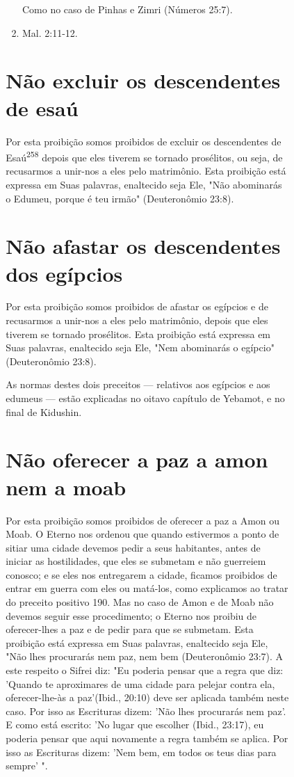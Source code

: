 \begin{itemize}
\begin{enumrate}
\begin{itemize}
\begin{itemize}
\begin{itemize}
\begin{enumerate}
 Como no caso de Pinhas e Zimri (Números 25:7).
 
\item
 
 Mal. 2:11-12.
 
\end{enumerate}



\section{Não excluir os descendentes de esaú}

Por esta proibição somos proibidos de excluir os descendentes de
Esaú\textsuperscript{258} depois que eles tiverem se tornado prosélitos,
ou seja, de recusarmos a unir-nos a eles pelo matrimônio. Esta proibição
está expressa em Suas pala­vras, enaltecido seja Ele, "Não abominarás o
Edumeu, porque é teu irmão" (Deu­teronômio 23:8).


\section{Não afastar os descendentes dos egípcios}


Por esta proibição somos proibidos de afastar os egípcios e de
recu­sarmos a unir-nos a eles pelo matrimônio, depois que eles tiverem
se tornado prosélitos. Esta proibição está expressa em Suas palavras,
enaltecido seja Ele, "Nem abominarás o egípcio" (Deuteronômio 23:8).

As normas destes dois preceitos --- relativos aos egípcios e aos
edu­meus --- estão explicadas no oitavo capítulo de Yebamot, e no final
de Kidushin.

\section{Não oferecer a paz a amon nem a moab}

Por esta proibição somos proibidos de oferecer a paz a Amon ou Moab. O
Eterno nos ordenou que quando estivermos a ponto de sitiar uma ci­dade
devemos pedir a seus habitantes, antes de iniciar as hostilidades, que
eles se submetam e não guerreiem conosco; e se eles nos entregarem a
cidade, fica­mos proibidos de entrar em guerra com eles ou matá-los,
como explicamos ao tratar do preceito positivo 190. Mas no caso de Amon
e de Moab não devemos seguir esse procedimento; o Eterno nos proibiu de
oferecer-lhes a paz e de pe­dir para que se submetam. Esta proibição
está expressa em Suas palavras, enal­tecido seja Ele, "Não lhes
procurarás nem paz, nem bem (Deuteronômio 23:7). A este respeito o
Sifrei diz: "Eu poderia pensar que a regra que diz: 'Quando te
aproximares de uma cidade para pelejar contra ela, oferecer-lhe-às a
paz'(Ibid., 20:10) deve ser aplicada também neste caso. Por isso as
Escrituras dizem: 'Não lhes procurarás nem paz'. E como está escrito:
'No lugar que escolher (Ibid., 23:17), eu poderia pensar que aqui
novamente a regra também se aplica. Por isso as Escrituras dizem: 'Nem
bem, em todos os teus dias para sempre' ".



\end{itemize}
\end{itemize}
\end{itemize}
\end{enumrate}
\end{itemize}
